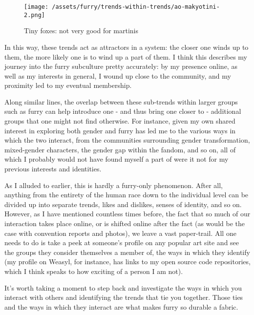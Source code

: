 \begin{figure}[htbp]
\centering
\texttt{[image: /assets/furry/trends-within-trends/ao-makyotini-2.png]}
\caption{Tiny foxes: not very good for martinis}
\end{figure}

In this way, these trends act as attractors in a system: the closer one
winds up to them, the more likely one is to wind up a part of them. I
think this describes my journey into the furry subculture pretty
accurately: by my presence online, as well as my interests in general, I
wound up close to the community, and my proximity led to my eventual
membership.

Along similar lines, the overlap between these sub-trends within larger
groups such as furry can help introduce one - and thus bring one closer
to - additional groups that one might not find otherwise. For instance,
given my own shared interest in exploring both gender and furry has led
me to the various ways in which the two interact, from the communities
surrounding gender transformation, mixed-gender characters, the gender
gap within the fandom, and so on, all of which I probably would not have
found myself a part of were it not for my previous interests and
identities.

As I alluded to earlier, this is hardly a furry-only phenomenon. After
all, anything from the entirety of the human race down to the individual
level can be divided up into separate trends, likes and dislikes, senses
of identity, and so on. However, as I have mentioned countless times
before, the fact that so much of our interaction takes place online, or
is shifted online after the fact (as would be the case with convention
reports and photos), we leave a vast paper-trail. All one needs to do is
take a peek at someone's profile on any popular art site and see the
groups they consider themselves a member of, the ways in which they
identify (my profile on Weasyl, for instance, has links to my open
source code repositories, which I think speaks to how exciting of a
person I am not).

It's worth taking a moment to step back and investigate the ways in
which you interact with others and identifying the trends that tie you
together. Those ties and the ways in which they interact are what makes
furry so durable a fabric.
